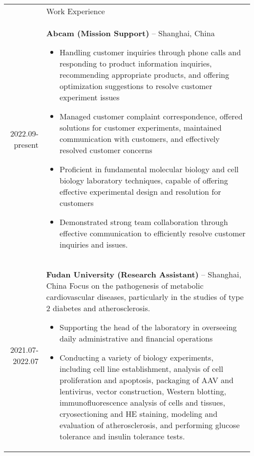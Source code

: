 \documentclass[letterpaper, 11pt]{article}
\newcommand{\headingfont}{\Large\color{LimeGreen}}
\newenvironment{SectionTable}[1]{
	\renewcommand*{\arraystretch}{1.7}
	\setlength{\tabcolsep}{10pt}
	\begin{longtable}{Rp{5.2in}} & #1 \\}
{\end{longtable}\vspace{-.3cm}}
\begin{document}
\begin{SectionTable}{\headingfont Work Experience}

2022.09-present &
\textbf{Abcam (Mission Support)} -- Shanghai, China
\begin{itemize}[itemsep=4pt, label={\textbullet}, parsep=1pt]
	\item Handling customer inquiries through phone calls and responding to product information inquiries, recommending appropriate products, and offering optimization suggestions to resolve customer experiment issues
	\item Managed customer complaint correspondence, offered solutions for customer experiments, maintained communication with customers, and effectively resolved customer concerns
	\item Proficient in fundamental molecular biology and cell biology laboratory techniques, capable of offering effective experimental design and resolution for customers
	\item Demonstrated strong team collaboration through effective communication to efficiently resolve customer inquiries and issues.
\end{itemize} \\

2021.07-2022.07 &
\textbf{Fudan University  (Research Assistant)} -- Shanghai, China \newline
Focus on the pathogenesis of metabolic cardiovascular diseases, particularly in the studies of type 2 diabetes and atherosclerosis. 
\begin{itemize}[itemsep=4pt, label={\textbullet}, parsep=1pt]
	\item Supporting the head of the laboratory in overseeing daily administrative and financial operations
	\item Conducting a variety of biology experiments, including cell line establishment, analysis of cell proliferation and apoptosis, packaging of AAV and lentivirus, vector construction, Western blotting, immunofluorescence analysis of cells and tissues, cryosectioning and HE staining, modeling and evaluation of atherosclerosis, and performing glucose tolerance and insulin tolerance tests.
\end{itemize}
\end{SectionTable}
\end{document}
